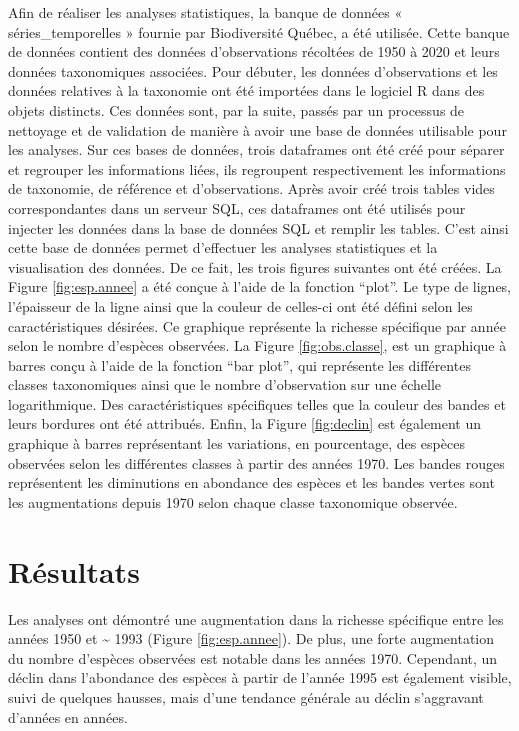 \documentclass[9pt,twocolumn,twoside,]{pnas-new}
\begin{document}
Afin de réaliser les analyses statistiques, la banque de données «
séries\_temporelles » fournie par Biodiversité Québec, a été utilisée.
Cette banque de données contient des données d'observations récoltées de
1950 à 2020 et leurs données taxonomiques associées. Pour débuter, les
données d'observations et les données relatives à la taxonomie ont été
importées dans le logiciel R dans des objets distincts. Ces données
sont, par la suite, passés par un processus de nettoyage et de
validation de manière à avoir une base de données utilisable pour les
analyses. Sur ces bases de données, trois dataframes ont été créé pour
séparer et regrouper les informations liées, ils regroupent
respectivement les informations de taxonomie, de référence et
d'observations. Après avoir créé trois tables vides correspondantes dans
un serveur SQL, ces dataframes ont été utilisés pour injecter les
données dans la base de données SQL et remplir les tables. C'est ainsi
cette base de données permet d'effectuer les analyses statistiques et la
visualisation des données. De ce fait, les trois figures suivantes ont
été créées. La Figure \ref{fig:esp.annee} a été conçue à l'aide de la
fonction ``plot''. Le type de lignes, l'épaisseur de la ligne ainsi que
la couleur de celles-ci ont été défini selon les caractéristiques
désirées. Ce graphique représente la richesse spécifique par année selon
le nombre d'espèces observées. La Figure \ref{fig:obs.classe}, est un
graphique à barres conçu à l'aide de la fonction ``bar plot'', qui
représente les différentes classes taxonomiques ainsi que le nombre
d'observation sur une échelle logarithmique. Des caractéristiques
spécifiques telles que la couleur des bandes et leurs bordures ont été
attribués. Enfin, la Figure \ref{fig:declin} est également un graphique
à barres représentant les variations, en pourcentage, des espèces
observées selon les différentes classes à partir des années 1970. Les
bandes rouges représentent les diminutions en abondance des espèces et
les bandes vertes sont les augmentations depuis 1970 selon chaque classe
taxonomique observée.

\section{Résultats}\label{ruxe9sultats}

Les analyses ont démontré une augmentation dans la richesse spécifique
entre les années 1950 et \textasciitilde{} 1993 (Figure
\ref{fig:esp.annee}). De plus, une forte augmentation du nombre
d'espèces observées est notable dans les années 1970. Cependant, un
déclin dans l'abondance des espèces à partir de l'année 1995 est
également visible, suivi de quelques hausses, mais d'une tendance
générale au déclin s'aggravant d'années en années.
\end{document}
